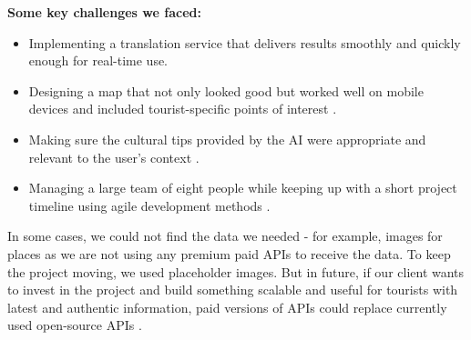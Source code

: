 \textbf{Some key challenges we faced:}
\begin{itemize}
  \item Implementing a translation service that delivers results smoothly and quickly enough for real-time use.
  \item Designing a map that not only looked good but worked well on mobile devices and included tourist-specific points of interest \cite{uxTourism}.
  \item Making sure the cultural tips provided by the AI were appropriate and relevant to the user’s context \cite{aiBias}.
  \item Managing a large team of eight people while keeping up with a short project timeline using agile development methods \cite{agileTeams}.
\end{itemize}

In some cases, we could not find the data we needed - for example, images for places as we are not using any premium paid APIs to receive the data. To keep the project moving, we used placeholder images. But in future, if our client wants to invest in the project and build something scalable and useful for tourists with latest and authentic information, paid versions of APIs could replace currently used open-source APIs \cite{crowdsourcing}.